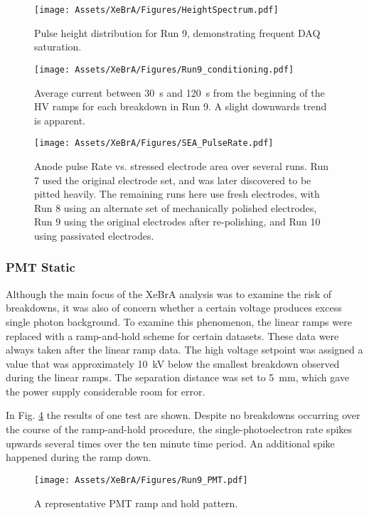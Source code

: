 \begin{figure}
    \centering
    \texttt{[image: Assets/XeBrA/Figures/HeightSpectrum.pdf]}
    \caption{Pulse height distribution for Run 9, demonstrating frequent DAQ saturation. }
    \label{fig:run_901_height}
\end{figure}

\begin{figure}
    \centering
    \texttt{[image: Assets/XeBrA/Figures/Run9\_conditioning.pdf]}
    \caption[Average current between 30~s and 120~s from the beginning of the HV ramps for each breakdown in Run 9. ]%
    {Average current between 30~s and 120~s from the beginning of the HV ramps for each breakdown in Run 9. 
    A slight downwards trend is apparent.}
    \label{fig:Conditioning_Plot}
\end{figure}
\begin{figure}
    \centering
    \texttt{[image: Assets/XeBrA/Figures/SEA\_PulseRate.pdf]}
    \caption[Anode pulse Rate vs. stressed electrode area over several runs.]%
    {Anode pulse Rate vs. stressed electrode area over several runs.
    Run 7 used the original electrode set, and was later discovered to be pitted heavily.
    The remaining runs here use fresh electrodes, with Run 8 using an alternate set of mechanically polished electrodes, Run 9 using the original electrodes after re-polishing, and Run 10 using passivated electrodes.}
    \label{fig:pulserate_sea}
\end{figure}
\afterpage{\FloatBarrier}
\subsubsection{PMT Static}

Although the main focus of the XeBrA analysis was to examine the risk of breakdowns, it was also of concern whether a certain voltage produces excess single photon background.
To examine this phenomenon, the linear ramps were replaced with a ramp-and-hold scheme for certain datasets.
These data were always taken after the linear ramp data.
The high voltage setpoint was assigned a value that was approximately 10~kV below the smallest breakdown observed during the linear ramps.
The separation distance was set to 5~mm, which gave the power supply considerable room for error.


In Fig. \ref{fig:pmt_scan} the results of one test are shown. 
Despite no breakdowns occurring over the course of the ramp-and-hold procedure, the single-photoelectron rate spikes upwards several times over the ten minute time period.
An additional spike happened during the ramp down.
\begin{figure}
    \centering
    \texttt{[image: Assets/XeBrA/Figures/Run9\_PMT.pdf]}
    \caption{A representative PMT ramp and hold pattern.}
    \label{fig:pmt_scan}
\end{figure}


